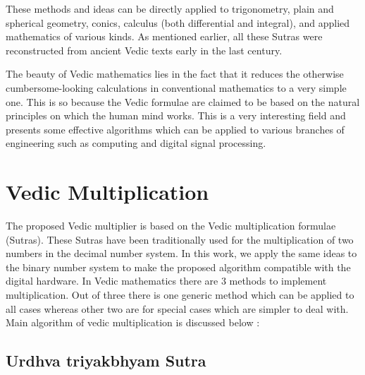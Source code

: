 These methods and ideas can be directly applied to trigonometry, plain and spherical geometry, conics, calculus (both differential and integral), and applied mathematics of various kinds. As mentioned earlier, all these Sutras were reconstructed from ancient Vedic texts early in the last century. %

The beauty of Vedic mathematics lies in the fact that it reduces the otherwise cumbersome-looking calculations in conventional mathematics to a very simple one. This is so because the Vedic formulae are claimed to be based on the natural principles on which the human mind works. This is a very interesting field and presents some effective algorithms which can be applied to various branches of engineering such as computing and digital signal processing.


\section{Vedic Multiplication}

The proposed Vedic multiplier is based on the Vedic multiplication formulae (Sutras). These Sutras have been traditionally used for the multiplication of two numbers in the decimal number system. In this work, we apply the same ideas to the binary number system to make the proposed algorithm compatible with the digital hardware. In Vedic mathematics there are 3 methods to implement multiplication. Out of three there is
one generic method which can be applied to all cases whereas other two are for special cases which are simpler to deal with. Main algorithm of vedic multiplication is discussed below :

\subsection{Urdhva triyakbhyam Sutra}

